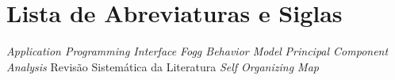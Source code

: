\chapter*{Lista de Abreviaturas e Siglas}


\begin{acronym}

 {\textit{Application Programming Interface}}	
 {\textit{Fogg Behavior Model}}
 {\textit{Principal Component Analysis}}
 {Revisão Sistemática da Literatura}
 {\textit{Self Organizing Map}}

\end{acronym}